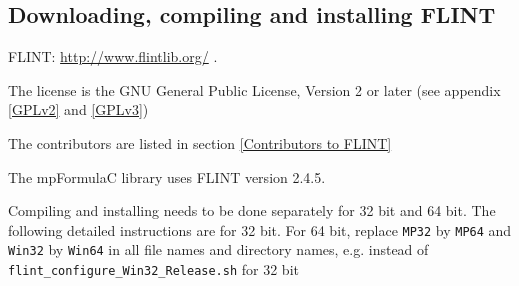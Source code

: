 %
%

\newpage
\subsection{Downloading, compiling and installing FLINT}

FLINT: \href{http://www.flintlib.org/}{http://www.flintlib.org/} . 

\vpara
The license is the GNU General Public License, Version 2 or later (see appendix \ref{GPLv2} and \ref{GPLv3})

\vpara
The contributors are listed in section \ref{Contributors to FLINT}

\vpara
The  mpFormulaC library uses FLINT version 2.4.5.



\vpara
Compiling and installing needs to be done separately for 32 bit and 64 bit. The following detailed instructions are for 32 bit. For 64 bit, replace \verb|MP32| by \verb|MP64| and \verb|Win32| by  \verb|Win64| in all file names and directory names, e.g. instead of \verb|flint_configure_Win32_Release.sh| for 32 bit

